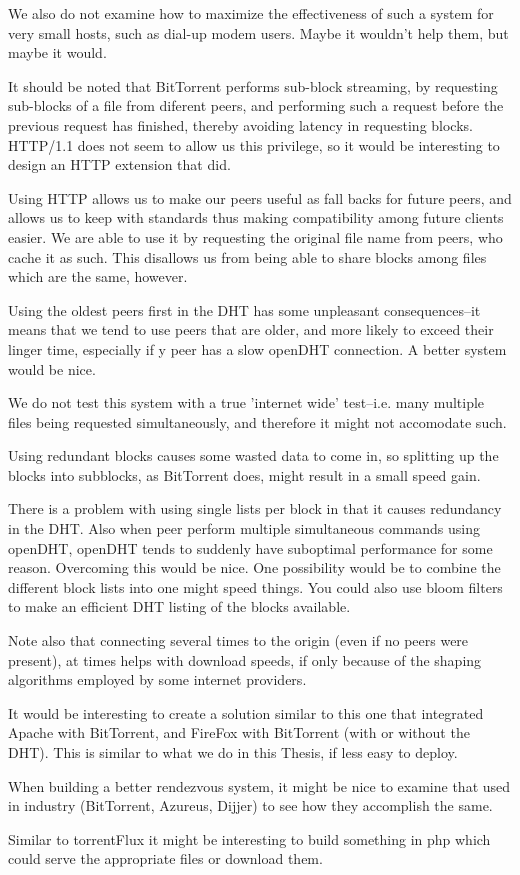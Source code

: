 We also do not examine how to maximize the effectiveness of such a system for very small hosts, such as dial-up modem users.  Maybe it wouldn't help them, but maybe it would.

It should be noted that BitTorrent performs sub-block streaming, by requesting sub-blocks of a file from diferent peers, and performing such a request before the previous request has finished, thereby avoiding latency in requesting blocks.  HTTP/1.1 does not seem to allow us this privilege, so it would be interesting to design an HTTP extension that did.

Using HTTP allows us to make our peers useful as fall backs for future peers, and allows us to keep with standards thus making compatibility among future clients easier.  We are able to use it by requesting the original file name from peers, who cache it as such.  This disallows us from being able to share blocks among files which are the same, however.

Using the oldest peers first in the DHT has some unpleasant consequences--it means that we tend to use peers that are older, and more likely to exceed their linger time, especially if y peer has a slow openDHT connection.  A better system would be nice.

We do not test this system with a true 'internet wide' test--i.e. many multiple files being requested simultaneously, and therefore it might not accomodate such.

Using redundant blocks causes some wasted data to come in, so splitting up the blocks into subblocks, as BitTorrent does, might result in a small speed gain.

There is a problem with using single lists per block in that it causes redundancy in the DHT.  Also when peer perform multiple simultaneous commands using openDHT, openDHT tends to suddenly have suboptimal performance for some reason.  Overcoming this would be nice.  One possibility would be to combine the different block lists into one might speed things.  You could also use bloom filters to make an efficient DHT listing of the blocks available.

Note also that connecting several times to the origin (even if no peers were present), at times helps with download speeds, if only because of the shaping algorithms employed by some internet providers.

It would be interesting to create a solution similar to this one that integrated Apache with BitTorrent, and FireFox with BitTorrent (with or without the DHT).  This is similar to what we do in this Thesis, if less easy to deploy.

When building a better rendezvous system, it might be nice to examine that used in industry (BitTorrent, Azureus, Dijjer) to see how they accomplish the same.

Similar to torrentFlux\cite{torrentFlux} it might be interesting to build something in php which could serve the appropriate files or download them.
